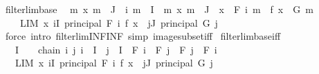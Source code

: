 \begin{isabellebody}
\endisatagproof
{\isafoldproof}%
%
\isadelimproof
\isanewline
%
\endisadelimproof
\isanewline
{}\isamarkupfalse%
\ filterlim{\isacharunderscore}{\kern0pt}base{\isacharcolon}{\kern0pt}\isanewline
\ \ {\isachardoublequoteopen}{\isacharparenleft}{\kern0pt}{\isasymAnd}m\ x{\isachardot}{\kern0pt}\ m\ {\isasymin}\ J\ {\isasymLongrightarrow}\ i\ m\ {\isasymin}\ I{\isacharparenright}{\kern0pt}\ {\isasymLongrightarrow}\ {\isacharparenleft}{\kern0pt}{\isasymAnd}m\ x{\isachardot}{\kern0pt}\ m\ {\isasymin}\ J\ {\isasymLongrightarrow}\ x\ {\isasymin}\ F\ {\isacharparenleft}{\kern0pt}i\ m{\isacharparenright}{\kern0pt}\ {\isasymLongrightarrow}\ f\ x\ {\isasymin}\ G\ m{\isacharparenright}{\kern0pt}\ {\isasymLongrightarrow}\isanewline
\ \ \ \ LIM\ x\ {\isacharparenleft}{\kern0pt}{\isasymSqinter}i{\isasymin}I{\isachardot}{\kern0pt}\ principal\ {\isacharparenleft}{\kern0pt}F\ i{\isacharparenright}{\kern0pt}{\isacharparenright}{\kern0pt}{\isachardot}{\kern0pt}\ f\ x\ {\isacharcolon}{\kern0pt}{\isachargreater}{\kern0pt}\ {\isacharparenleft}{\kern0pt}{\isasymSqinter}j{\isasymin}J{\isachardot}{\kern0pt}\ principal\ {\isacharparenleft}{\kern0pt}G\ j{\isacharparenright}{\kern0pt}{\isacharparenright}{\kern0pt}{\isachardoublequoteclose}\isanewline
%
\isadelimproof
\ \ %
\endisadelimproof
%
\isatagproof
{}\isamarkupfalse%
\ {\isacharparenleft}{\kern0pt}force\ intro{\isacharbang}{\kern0pt}{\isacharcolon}{\kern0pt}\ filterlim{\isacharunderscore}{\kern0pt}INF{\isacharunderscore}{\kern0pt}INF\ simp{\isacharcolon}{\kern0pt}\ image{\isacharunderscore}{\kern0pt}subset{\isacharunderscore}{\kern0pt}iff{\isacharparenright}{\kern0pt}%
\endisatagproof
{\isafoldproof}%
%
\isadelimproof
\isanewline
%
\endisadelimproof
\isanewline
{}\isamarkupfalse%
\ filterlim{\isacharunderscore}{\kern0pt}base{\isacharunderscore}{\kern0pt}iff{\isacharcolon}{\kern0pt}\isanewline
\ \ \ {\isachardoublequoteopen}I\ {\isasymnoteq}\ {\isacharbraceleft}{\kern0pt}{\isacharbraceright}{\kern0pt}{\isachardoublequoteclose}\ \ chain{\isacharcolon}{\kern0pt}\ {\isachardoublequoteopen}{\isasymAnd}i\ j{\isachardot}{\kern0pt}\ i\ {\isasymin}\ I\ {\isasymLongrightarrow}\ j\ {\isasymin}\ I\ {\isasymLongrightarrow}\ F\ i\ {\isasymsubseteq}\ F\ j\ {\isasymor}\ F\ j\ {\isasymsubseteq}\ F\ i{\isachardoublequoteclose}\isanewline
\ \ \ {\isachardoublequoteopen}{\isacharparenleft}{\kern0pt}LIM\ x\ {\isacharparenleft}{\kern0pt}{\isasymSqinter}i{\isasymin}I{\isachardot}{\kern0pt}\ principal\ {\isacharparenleft}{\kern0pt}F\ i{\isacharparenright}{\kern0pt}{\isacharparenright}{\kern0pt}{\isachardot}{\kern0pt}\ f\ x\ {\isacharcolon}{\kern0pt}{\isachargreater}{\kern0pt}\ {\isasymSqinter}j{\isasymin}J{\isachardot}{\kern0pt}\ principal\ {\isacharparenleft}{\kern0pt}G\ j{\isacharparenright}{\kern0pt}{\isacharparenright}{\kern0pt}\ {\isasymlongleftrightarrow}\isanewline

\end{isabellebody}
